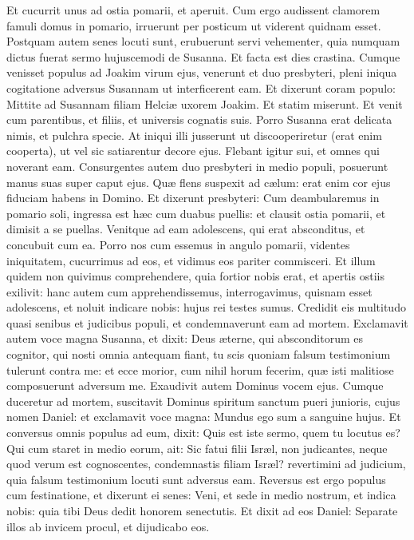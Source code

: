 {{ Et cucurrit unus ad ostia pomarii, et aperuit.
 Cum ergo audissent clamorem famuli domus in pomario, irruerunt per posticum ut viderent quidnam esset.
 Postquam autem senes locuti sunt, erubuerunt servi vehementer, quia numquam dictus fuerat sermo hujuscemodi de Susanna. Et facta est dies crastina.
 Cumque venisset populus ad Joakim virum ejus, venerunt et duo presbyteri, pleni iniqua cogitatione adversus Susannam ut interficerent eam.
 Et dixerunt coram populo: Mittite ad Susannam filiam Helciæ uxorem Joakim. Et statim miserunt.
 Et venit cum parentibus, et filiis, et universis cognatis suis.
 Porro Susanna erat delicata nimis, et pulchra specie.
 At iniqui illi jusserunt ut discooperiretur (erat enim cooperta), ut vel sic satiarentur decore ejus.
 Flebant igitur sui, et omnes qui noverant eam.
 Consurgentes autem duo presbyteri in medio populi, posuerunt manus suas super caput ejus.
 Quæ flens suspexit ad cælum: erat enim cor ejus fiduciam habens in Domino.
 Et dixerunt presbyteri: Cum deambularemus in pomario soli, ingressa est hæc cum duabus puellis: et clausit ostia pomarii, et dimisit a se puellas.
 Venitque ad eam adolescens, qui erat absconditus, et concubuit cum ea.
 Porro nos cum essemus in angulo pomarii, videntes iniquitatem, cucurrimus ad eos, et vidimus eos pariter commisceri.
 Et illum quidem non quivimus comprehendere, quia fortior nobis erat, et apertis ostiis exilivit:
 hanc autem cum apprehendissemus, interrogavimus, quisnam esset adolescens, et noluit indicare nobis: hujus rei testes sumus.
 Credidit eis multitudo quasi senibus et judicibus populi, et condemnaverunt eam ad mortem.
 Exclamavit autem voce magna Susanna, et dixit: Deus æterne, qui absconditorum es cognitor, qui nosti omnia antequam fiant,
 tu scis quoniam falsum testimonium tulerunt contra me: et ecce morior, cum nihil horum fecerim, quæ isti malitiose composuerunt adversum me.
 Exaudivit autem Dominus vocem ejus.
 Cumque duceretur ad mortem, suscitavit Dominus spiritum sanctum pueri junioris, cujus nomen Daniel:
 et exclamavit voce magna: Mundus ego sum a sanguine hujus.
 Et conversus omnis populus ad eum, dixit: Quis est iste sermo, quem tu locutus es?
 Qui cum staret in medio eorum, ait: Sic fatui filii Isræl, non judicantes, neque quod verum est cognoscentes, condemnastis filiam Isræl?
 revertimini ad judicium, quia falsum testimonium locuti sunt adversus eam.
 Reversus est ergo populus cum festinatione, et dixerunt ei senes: Veni, et sede in medio nostrum, et indica nobis: quia tibi Deus dedit honorem senectutis.
 Et dixit ad eos Daniel: Separate illos ab invicem procul, et dijudicabo eos.
}}

